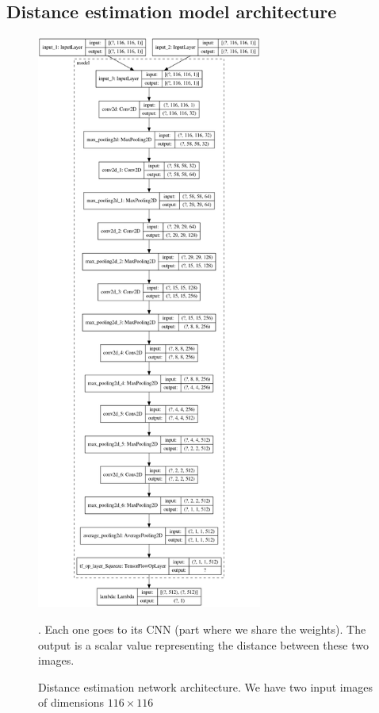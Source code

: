 \newpage
\subsection{Distance estimation model architecture}
\label{subs:apx_de_arch}
\begin{figure}[ht!]
    \centering
    \includegraphics[height=19cm]{images/model_plot.png}
    \caption{Distance estimation network architecture. We have two input images of dimensions $116\times 116$}. Each one goes to its CNN (part where we share the weights). The output is a scalar value representing the distance between these two images.
    \label{fig:de-architecture}
\end{figure}
